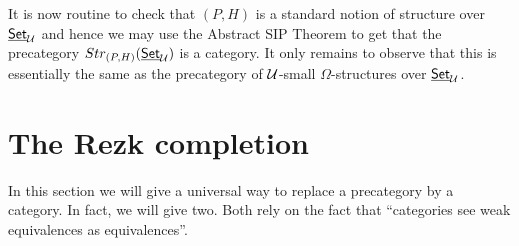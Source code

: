 \begin{defn}
\begin{enumerate}
\end{enumerate}
\end{defn}
It is now routine to check that $(P,H)$ is a standard notion of structure over $\underline{\mathsf{Set}}_\mathcal{U}$ and hence we may use the Abstract SIP Theorem to get that the precategory $Str_{(P,H)}(\underline{\mathsf{Set}}_\mathcal{U})$ is a category.  It only remains to observe that this is essentially the same as the precategory of $\mathcal{U}$-small $\Omega$-structures over $\underline{\mathsf{Set}}_\mathcal{U}$.


\section{The Rezk completion}
\label{sec:rezk}

In this section we will give a universal way to replace a precategory by a category.
In fact, we will give two.
Both rely on the fact that ``categories see weak equivalences as equivalences''.

